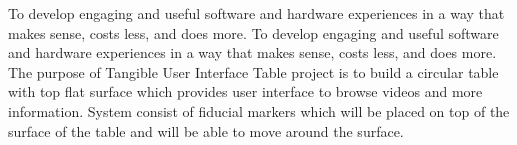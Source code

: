 To develop engaging and useful software and hardware experiences in a way that makes sense, costs less, and does more. To develop engaging and useful software and hardware experiences in a way that makes sense, costs less, and does more. The purpose of Tangible User Interface Table project is to build a circular table with top flat surface which provides user interface to browse videos and more information. System consist of fiducial markers which will be placed on top of the surface of the table and will be able to move around the surface. 

